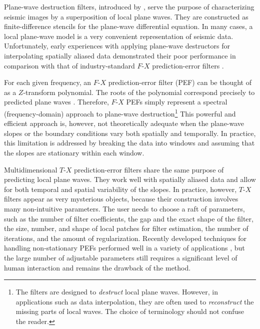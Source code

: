 Plane-wave destruction filters, introduced by
\cite{Claerbout.blackwell.92}, serve the purpose of characterizing
seismic images by a superposition of local plane waves.  They are
constructed as finite-difference stencils for the plane-wave
differential equation. In many cases, a local plane-wave model is a
very convenient representation of seismic data. Unfortunately, early
experiences with applying plane-wave destructors for interpolating
spatially aliased data
\cite[]{Nichols.sep.65.271,Claerbout.blackwell.92} demonstrated their
poor performance in comparison with that of industry-standard $F$-$X$
prediction-error filters \cite[]{GEO56-06-07850794}.
\par
For each given frequency, an $F$-$X$ prediction-error filter (PEF) can
be thought of as a $Z$-transform polynomial. The roots of the
polynomial correspond precisely to predicted plane waves
\cite[]{SEG-1984-S10.1}.  Therefore, $F$-$X$ PEFs simply represent a
spectral (frequency-domain) approach to plane-wave
destruction\footnote{The filters are designed to \emph{destruct} local
  plane waves. However, in applications such as data interpolation,
  they are often used to \emph{reconstruct} the missing parts of
  local waves. The choice of terminology should not confuse the
  reader.}  This powerful and efficient approach is, however, not
theoretically adequate when the plane-wave slopes or the boundary
conditions vary both spatially and temporally. In practice, this 
limitation is addressed by breaking the data into windows and assuming
that the slopes are stationary within each window.
\par
Multidimensional $T$-$X$ prediction-error filters
\cite[]{Claerbout.blackwell.92,gee} share the same purpose of predicting
local plane waves. They work well with spatially aliased data and
allow for both temporal and spatial variability of the slopes.  In
practice, however, $T$-$X$ filters appear as very mysterious objects,
because their construction involves many non-intuitive parameters. The
user needs to choose a raft of parameters, such as the number of
filter coefficients, the gap and the exact shape of the filter, the
size, number, and shape of local patches for filter estimation, the
number of iterations, and the amount of regularization. Recently
developed techniques for handling non-stationary PEFs
\cite[]{SEG-1999-11541157} performed well in
a variety of applications \cite[]{Crawley.sepphd.104,SEG-2001-13051308}, but the large
number of adjustable parameters still requires a significant level of
human interaction and remains the drawback of the method.

